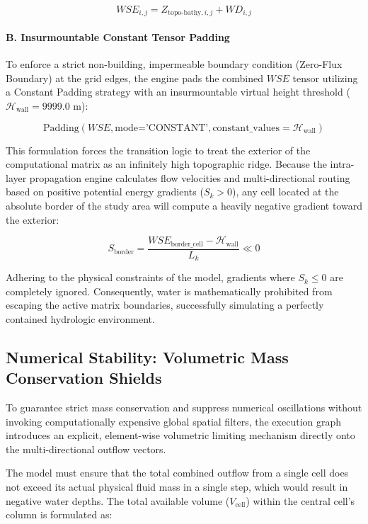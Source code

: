$$WSE_{i,j} = Z_{\text{topo-bathy}, i,j} + WD_{i,j}$$

\paragraph{B. Insurmountable Constant Tensor Padding}

To enforce a strict non-building, impermeable boundary condition (Zero-Flux Boundary) at the grid edges, the engine pads the combined $WSE$ 
tensor utilizing a Constant Padding strategy with an insurmountable virtual height threshold ($\mathcal{H}_{\text{wall}} = 9999.0\text{ m}$):

$$\text{Padding}(WSE, \text{mode='CONSTANT'}, \text{constant\_values}=\mathcal{H}_{\text{wall}})$$

This formulation forces the transition logic to treat the exterior of the computational matrix as an infinitely high topographic ridge. 
Because the intra-layer propagation engine calculates flow velocities and multi-directional routing based on positive potential energy 
gradients ($S_k > 0$), any cell located at the absolute border of the study area will compute a heavily negative gradient toward the 
exterior:

$$S_{\text{border}} = \frac{WSE_{\text{border\_cell}} - \mathcal{H}_{\text{wall}}}{L_k} \ll 0$$

Adhering to the physical constraints of the model, gradients where $S_k \le 0$ are completely ignored. Consequently, water is mathematically 
prohibited from escaping the active matrix boundaries, successfully simulating a perfectly contained hydrologic environment.

\subsection{Numerical Stability: Volumetric Mass Conservation Shields}

To guarantee strict mass conservation and suppress numerical oscillations without invoking computationally expensive global spatial filters, 
the execution graph introduces an explicit, element-wise volumetric limiting mechanism directly onto the multi-directional outflow vectors.

The model must ensure that the total combined outflow from a single cell does not exceed its actual physical fluid mass in a single step, 
which would result in negative water depths. The total available volume ($V_{\text{cell}}$) within the central cell's column is formulated 
as:

